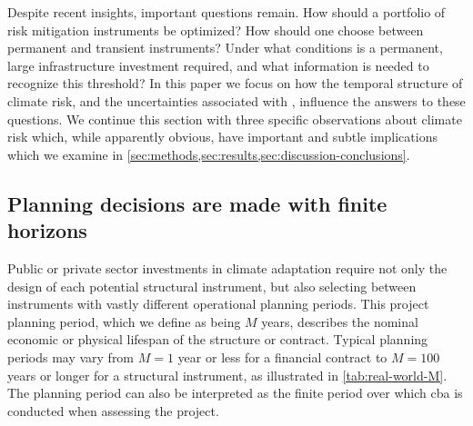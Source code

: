 \documentclass[
  draft,
  linenumbers
]{agujournal2018}
\begin{document}
Despite recent insights, important questions remain.
How should a portfolio of risk mitigation instruments be optimized?
How should one choose between permanent and transient instruments?
Under what conditions is a permanent, large infrastructure investment required, and what information is needed to recognize this threshold?
In this paper we focus on  how the temporal structure of climate risk, and the uncertainties associated with , influence the answers to these questions.
We continue this section with three specific observations about climate risk which, while apparently obvious, have important and subtle implications\add{,} which we examine in \cref{sec:methods,sec:results,sec:discussion-conclusions}.

\subsection{Planning decisions are made with finite horizons}\label{sec:intro-finite}

Public or private sector investments in climate adaptation require not only the design of each potential structural instrument, but also selecting between instruments with vastly different operational planning periods.
This project planning period, which we define as being $M$ years, describes the nominal economic or physical lifespan of the structure or contract.
Typical planning periods may vary from $M=1$ year or less for a financial contract to $M=100$ years or longer for a structural instrument, as illustrated in \cref{tab:real-world-M}.
The planning period can also be interpreted as the finite period over which \gls{cba} is conducted when assessing the project.
\end{document}
